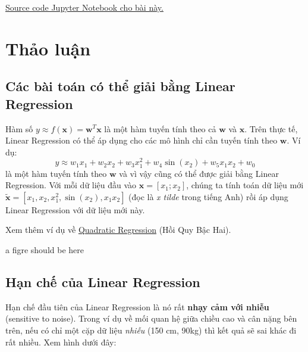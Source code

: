 \href{https://github.com/tiepvupsu/tiepvupsu.github.io/blob/master/assets/LR/LR.ipynb}{Source code Jupyter Notebook cho bài này.} 
 
 
 
\section{Thảo luận}
 
 
\subsection{Các bài toán có thể giải bằng Linear Regression}
Hàm số $y \approx f(\mathbf{x})= \mathbf{w}^T\mathbf{x}$ là một hàm tuyến tính theo cả $ \mathbf{w}$ và $\mathbf{x}$. Trên thực tế, Linear Regression có thể áp dụng cho các mô hình chỉ cần tuyến tính theo $\mathbf{w}$. Ví dụ: 
$$ 
y \approx w_1 x_1 + w_2 x_2 + w_3 x_1^2 +  w_4 \sin(x_2) + w_5 x_1x_2 + w_0 
$$ 
là một hàm tuyến tính theo $\mathbf{w}$ và vì vậy cũng có thể được giải bằng Linear Regression. Với mỗi dữ liệu đầu vào $\mathbf{x}=[x_1; x_2] $, chúng ta tính toán dữ liệu mới $\tilde{\mathbf{x}} = [x_1, x_2, x_1^2, \sin(x_2), x_1x_2]$ (đọc là \textit{x tilde} trong tiếng Anh) rồi áp dụng Linear Regression với dữ liệu mới này.  
 
Xem thêm ví dụ về \href{http://www.varsitytutors.com/hotmath/hotmath_help/topics/quadratic-regression}{Quadratic Regression} (Hồi Quy Bậc Hai). 
 
 a figre should be here 
 
\subsection{Hạn chế của Linear Regression}
 
Hạn chế đầu tiên của Linear Regression là nó rất \textbf{nhạy cảm với nhiễu} (sensitive to noise). Trong ví dụ về mối quan hệ giữa chiều cao và cân nặng bên trên, nếu có chỉ 
một cặp dữ liệu \textit{nhiễu} (150 cm, 90kg) thì kết quả sẽ sai khác đi rất nhiều. Xem hình dưới đây: 
 
